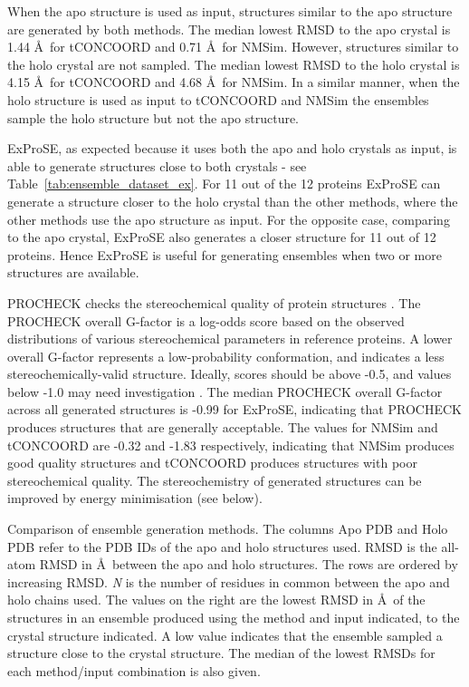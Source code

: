 When the apo structure is used as input, structures similar to the apo structure are generated by both methods.
The median lowest RMSD to the apo crystal is 1.44 \AA\ for tCONCOORD and 0.71 \AA\ for NMSim.
However, structures similar to the holo crystal are not sampled.
The median lowest RMSD to the holo crystal is 4.15 \AA\ for tCONCOORD and 4.68 \AA\ for NMSim.
In a similar manner, when the holo structure is used as input to tCONCOORD and NMSim the ensembles sample the holo structure but not the apo structure.

ExProSE, as expected because it uses both the apo and holo crystals as input, is able to generate structures close to both crystals - see Table~\ref{tab:ensemble_dataset_ex}.
For 11 out of the 12 proteins ExProSE can generate a structure closer to the holo crystal than the other methods, where the other methods use the apo structure as input.
For the opposite case, comparing to the apo crystal, ExProSE also generates a closer structure for 11 out of 12 proteins.
Hence ExProSE is useful for generating ensembles when two or more structures are available.

PROCHECK checks the stereochemical quality of protein structures \cite{Laskowski1993}.
The PROCHECK overall G-factor is a log-odds score based on the observed distributions of various stereochemical parameters in reference proteins.
A lower overall G-factor represents a low-probability conformation, and indicates a less stereochemically-valid structure.
Ideally, scores should be above -0.5, and values below -1.0 may need investigation \cite{Esposito2006}.
The median PROCHECK overall G-factor across all generated structures is -0.99 for ExProSE, indicating that PROCHECK produces structures that are generally acceptable.
The values for NMSim and tCONCOORD are -0.32 and -1.83 respectively, indicating that NMSim produces good quality structures and tCONCOORD produces structures with poor stereochemical quality.
The stereochemistry of generated structures can be improved by energy minimisation (see below).


\begin{table}
\centering


\caption{Comparison of ensemble generation methods.
The columns Apo PDB and Holo PDB refer to the PDB IDs of the apo and holo structures used.
RMSD is the all-atom RMSD in \AA\ between the apo and holo structures.
The rows are ordered by increasing RMSD.
\textit{N} is the number of residues in common between the apo and holo chains used.
The values on the right are the lowest RMSD in \AA\ of the structures in an ensemble produced using the method and input indicated, to the crystal structure indicated.
A low value indicates that the ensemble sampled a structure close to the crystal structure.
The median of the lowest RMSDs for each method/input combination is also given.}

\label{tab:ensemble_dataset}
\end{table}



